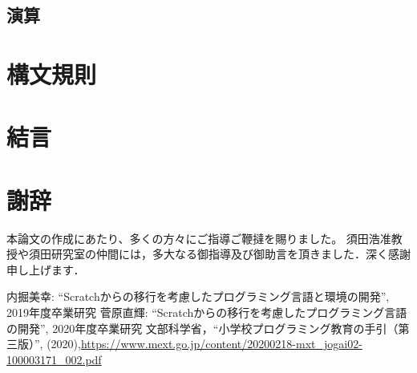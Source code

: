 \documentclass[10pt,a4j]{ltjsarticle}
\begin{document}
\subsection{演算}

\section{構文規則}

\section{結言}
\clearpage

\section{謝辞}
本論文の作成にあたり、多くの方々にご指導ご鞭撻を賜りました。
須田浩准教授や須田研究室の仲間には，多大なる御指導及び御助言を頂きました．深く感謝申し上げます．
\clearpage

\begin{thebibliography}{99}
 内掘美幸: ``Scratchからの移行を考慮したプログラミング言語と環境の開発'', 2019年度卒業研究
 菅原直輝: ``Scratchからの移行を考慮したプログラミング言語の開発'', 2020年度卒業研究
 文部科学省，``小学校プログラミング教育の手引（第三版）'', (2020),\url{https://www.mext.go.jp/content/20200218-mxt_jogai02-100003171_002.pdf}
\end{thebibliography}
\end{document}
